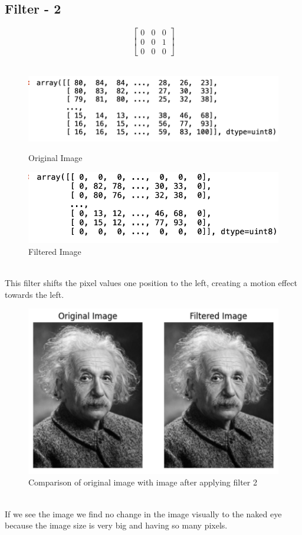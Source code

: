 \documentclass{assignment}
\begin{document}
\subsection{Filter - 2}
\[
\begin{bmatrix} 0 & 0 & 0 \\ 0 & 0 & 1 \\ 0 & 0 & 0 \end{bmatrix}
\]
\\
\begin{figure}[h]
  \begin{minipage}{0.5\textwidth}
    \centering
    \includegraphics[width=0.8\linewidth]{image.png}
    \caption{Original Image}
    \label{fig:original_image}
  \end{minipage}%
  \begin{minipage}{0.5\textwidth}
    \centering
    \includegraphics[width=0.8\linewidth]{f2.png}
    \caption{Filtered Image}
    \label{fig:filtered_image}
  \end{minipage}
\end{figure}
\\
This filter shifts the pixel values one position to the left, creating a motion effect towards the left.
\begin{figure}[h]
    \centering
    \includegraphics[width=0.4\linewidth]{magic.png}
    \caption{Comparison of original image with image after applying filter 2}
    \label{fig:enter-label}
\end{figure}
\\
If we see the image we  find no change in the image visually to the naked eye because the image size is very big and having so many pixels.
\end{document}
